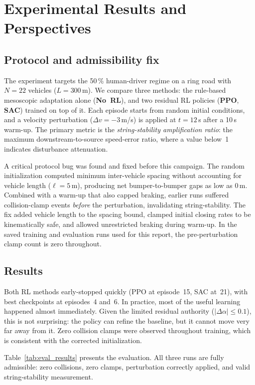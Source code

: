 \section{Experimental Results and Perspectives}

\subsection{Protocol and admissibility fix}

The experiment targets the 50\,\% human-driver regime on a ring road with $N{=}22$ vehicles ($L{=}300$\,m). We compare three methods: the rule-based mesoscopic adaptation alone (\textbf{No~RL}), and two residual RL policies (\textbf{PPO}, \textbf{SAC}) trained on top of it. Each episode starts from random initial conditions, and a velocity perturbation ($\Delta v = {-}3$\,m/s) is applied at $t{=}12$\,s after a 10\,s warm-up. The primary metric is the \emph{string-stability amplification ratio}: the maximum downstream-to-source speed-error ratio, where a value below~1 indicates disturbance attenuation.

A critical protocol bug was found and fixed before this campaign. The random initialization computed minimum inter-vehicle spacing without accounting for vehicle length ($\ell{=}5$\,m), producing net bumper-to-bumper gaps as low as 0\,m. Combined with a warm-up that also capped braking, earlier runs suffered collision-clamp events \emph{before} the perturbation, invalidating string-stability. The fix added vehicle length to the spacing bound, clamped initial closing rates to be kinematically safe, and allowed unrestricted braking during warm-up. In the saved training and evaluation runs used for this report, the pre-perturbation clamp count is zero throughout.

\subsection{Results}

Both RL methods early-stopped quickly (PPO at episode~15, SAC at~21), with best checkpoints at episodes~4 and~6. In practice, most of the useful learning happened almost immediately. Given the limited residual authority ($|\Delta\alpha| \leq 0.1$), this is not surprising: the policy can refine the baseline, but it cannot move very far away from it. Zero collision clamps were observed throughout training, which is consistent with the corrected initialization.

Table~\ref{tab:eval_results} presents the evaluation. All three runs are fully admissible: zero collisions, zero clamps, perturbation correctly applied, and valid string-stability measurement.

